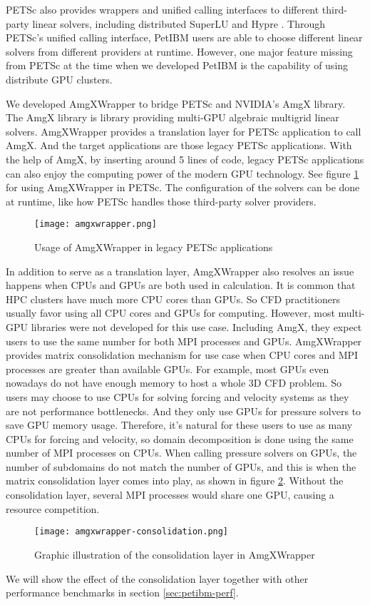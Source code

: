 PETSc also provides wrappers and unified calling interfaces to different third-party linear solvers, including distributed SuperLU \cite{sao_communication-avoiding_2019} and Hypre \cite{noauthor_hypre_nodate}.
Through PETSc's unified calling interface, PetIBM users are able to choose different linear solvers from different providers at runtime. 
However, one major feature missing from PETSc at the time when we developed PetIBM is the capability of using distribute GPU clusters.

We developed AmgXWrapper \cite{chuang_geoclaw-arcgis_2019} to bridge PETSc and NVIDIA's AmgX library.
The AmgX library is library providing multi-GPU algebraic multigrid linear solvers.
AmgXWrapper provides a translation layer for PETSc application to call AmgX.
And the target applications are those legacy PETSc applications.
With the help of AmgX, by inserting around 5 lines of code, legacy PETSc applications can also enjoy the computing power of the modern GPU technology.
See figure \ref{fig:amgxwrapper} for using AmgXWrapper in PETSc.
The configuration of the solvers can be done at runtime, like how PETSc handles those third-party solver providers.
\begin{figure}[H]
    \texttt{[image: amgxwrapper.png]}
    \caption{Usage of AmgXWrapper in legacy PETSc applications}
    \label{fig:amgxwrapper}
\end{figure}

In addition to serve as a translation layer, AmgXWrapper also resolves an issue happens when CPUs and GPUs are both used in calculation.
It is common that HPC clusters have much more CPU cores than GPUs.
So CFD practitioners usually favor using all CPU cores and GPUs for computing.
However, most multi-GPU libraries were not developed for this use case.
Including AmgX, they expect users to use the same number for both MPI processes and GPUs.
AmgXWrapper provides matrix consolidation mechanism for use case when CPU cores and MPI processes are greater than available GPUs.
For example, most GPUs even nowadays do not have enough memory to host a whole 3D CFD problem.
So users may choose to use CPUs for solving forcing and velocity systems as they are not performance bottlenecks.
And they only use GPUs for pressure solvers to save GPU memory usage.
Therefore, it's natural for these users to use as many CPUs for forcing and velocity, so domain decomposition is done using the same number of MPI processes on CPUs.
When calling pressure solvers on GPUs, the number of subdomains do not match the number of GPUs, and this is when the matrix consolidation layer comes into play, as shown in figure \ref{fig:amgxwrapper-consolidation}.
Without the consolidation layer, several MPI processes would share one GPU, causing a resource competition.

\begin{figure}[H]
    \texttt{[image: amgxwrapper-consolidation.png]}
    \caption{Graphic illustration of the consolidation layer in AmgXWrapper}
    \label{fig:amgxwrapper-consolidation}
\end{figure}

We will show the effect of the consolidation layer together with other performance benchmarks in section \ref{sec:petibm-perf}.
